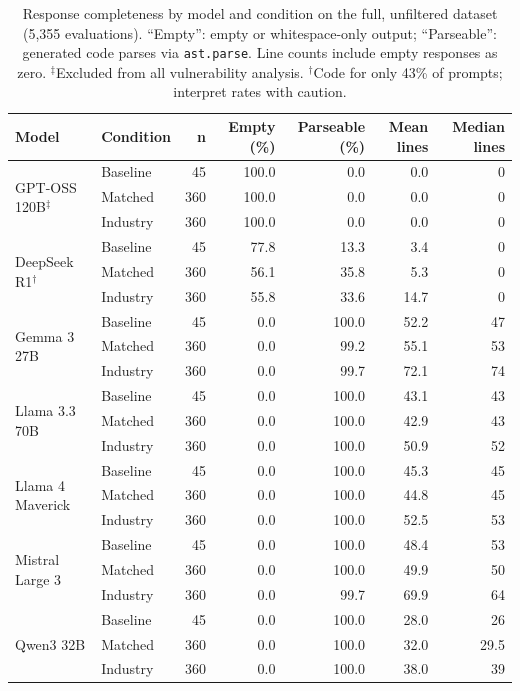 \documentclass[sigconf,review,anonymous]{acmart}
\begin{document}
\begin{table}[t]
\caption{Response completeness by model and condition on the full, unfiltered dataset (5,355 evaluations). ``Empty'': empty or whitespace-only output; ``Parseable'': generated code parses via \texttt{ast.parse}. Line counts include empty responses as zero. $^{\ddagger}$Excluded from all vulnerability analysis. $^{\dagger}$Code for only 43\% of prompts; interpret rates with caution.}
\label{tab:completeness}
\centering
\footnotesize
\begin{tabular}{llrrrrr}
\toprule
\textbf{Model} & \textbf{Condition} & \textbf{n} & \textbf{Empty (\%)} & \textbf{Parseable (\%)} & \textbf{Mean lines} & \textbf{Median lines} \\
\midrule
\multirow{3}{*}{GPT-OSS 120B$^{\ddagger}$} & Baseline & 45 & 100.0 & 0.0 & 0.0 & 0 \\
 & Matched & 360 & 100.0 & 0.0 & 0.0 & 0 \\
 & Industry & 360 & 100.0 & 0.0 & 0.0 & 0 \\
\midrule
\multirow{3}{*}{DeepSeek R1$^{\dagger}$} & Baseline & 45 & 77.8 & 13.3 & 3.4 & 0 \\
 & Matched & 360 & 56.1 & 35.8 & 5.3 & 0 \\
 & Industry & 360 & 55.8 & 33.6 & 14.7 & 0 \\
\midrule
\multirow{3}{*}{Gemma 3 27B} & Baseline & 45 & 0.0 & 100.0 & 52.2 & 47 \\
 & Matched & 360 & 0.0 & 99.2 & 55.1 & 53 \\
 & Industry & 360 & 0.0 & 99.7 & 72.1 & 74 \\
\midrule
\multirow{3}{*}{Llama 3.3 70B} & Baseline & 45 & 0.0 & 100.0 & 43.1 & 43 \\
 & Matched & 360 & 0.0 & 100.0 & 42.9 & 43 \\
 & Industry & 360 & 0.0 & 100.0 & 50.9 & 52 \\
\midrule
\multirow{3}{*}{Llama 4 Maverick} & Baseline & 45 & 0.0 & 100.0 & 45.3 & 45 \\
 & Matched & 360 & 0.0 & 100.0 & 44.8 & 45 \\
 & Industry & 360 & 0.0 & 100.0 & 52.5 & 53 \\
\midrule
\multirow{3}{*}{Mistral Large 3} & Baseline & 45 & 0.0 & 100.0 & 48.4 & 53 \\
 & Matched & 360 & 0.0 & 100.0 & 49.9 & 50 \\
 & Industry & 360 & 0.0 & 99.7 & 69.9 & 64 \\
\midrule
\multirow{3}{*}{Qwen3 32B} & Baseline & 45 & 0.0 & 100.0 & 28.0 & 26 \\
 & Matched & 360 & 0.0 & 100.0 & 32.0 & 29.5 \\
 & Industry & 360 & 0.0 & 100.0 & 38.0 & 39 \\
\bottomrule
\end{tabular}
\end{table}
\end{document}
